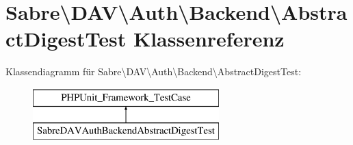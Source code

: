 \hypertarget{class_sabre_1_1_d_a_v_1_1_auth_1_1_backend_1_1_abstract_digest_test}{}\section{Sabre\textbackslash{}D\+AV\textbackslash{}Auth\textbackslash{}Backend\textbackslash{}Abstract\+Digest\+Test Klassenreferenz}
\label{class_sabre_1_1_d_a_v_1_1_auth_1_1_backend_1_1_abstract_digest_test}
Klassendiagramm für Sabre\textbackslash{}D\+AV\textbackslash{}Auth\textbackslash{}Backend\textbackslash{}Abstract\+Digest\+Test\+:\begin{figure}[H]
\begin{center}
\leavevmode
\includegraphics[height=2.000000cm]{class_sabre_1_1_d_a_v_1_1_auth_1_1_backend_1_1_abstract_digest_test}
\end{center}
\end{figure}
